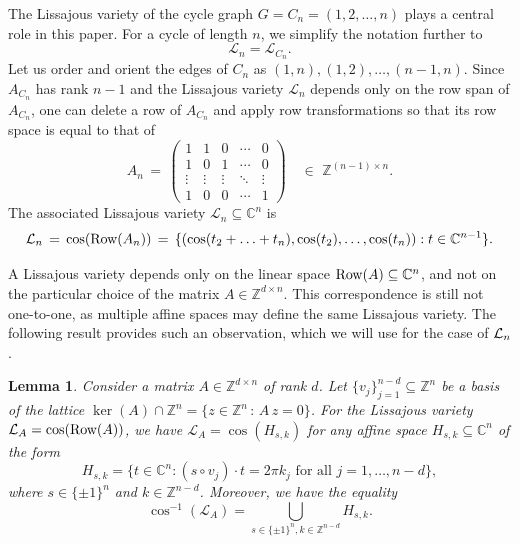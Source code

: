 \documentclass[a4paper, 11pt, twoside]{article}
\newcommand{\C}{\mathbb{C}}
\newcommand{\Row}{{\text{\rm Row}}}
\newcommand{\ML}{{\mathcal L}}
\newcommand{\Z}{\mathbb Z}
\theoremstyle{plain}
\newtheorem{lemma}[theorem]{Lemma}
\begin{document}
The Lissajous variety of the cycle graph $G=C_n=(1,2,\ldots,n)$ plays a central role in this paper. For a cycle of length $n$, we simplify the notation further to
$$\mathcal L_n=\ML_{C_n}.$$ 
Let us order and orient the edges of $C_n$ as
 $(1,n), (1,2),\ldots, (n-1,n)$. 
 Since $A_{C_n}$ has rank $n-1$ and the Lissajous variety $\mathcal L_n$ depends only on the row span of $A_{C_n}$, 
one can delete a row of $A_{C_n}$ and apply row transformations so that its row space   is equal to that of  \begin{equation} \label{eq:cycleAn} A_{n} \, = \, \begin{pmatrix}
    1 & 1 & 0 & \cdots & 0 \\ 
    1 & 0 & 1 & \cdots & 0 \\ 
    \vdots & \vdots & \vdots & \ddots & \vdots \\ 
    1 & 0 & 0 & \cdots & 1
\end{pmatrix} \quad \in \, \, \mathbb{Z}^{(n-1) \times n}.\end{equation}
 The associated Lissajous variety $\mathcal L_n \subseteq \mathbb{C}^n$ is 
 \begin{equation}
\label{eq:parametrize}
\mathcal L_n \,  = \, \cos(\Row(A_n)) \, = \, \{( \cos(t_2+\dotsc+t_n), \cos(t_2),\dotsc, \cos(t_n )): t\in \C^{n-1}\}.
\end{equation}

A Lissajous variety depends only on the linear space ${\rm Row}(A) \subseteq \mathbb{C}^n$, and not on the particular choice of the matrix $A \in \mathbb{Z}^{d \times n}$. 
This correspondence is still not one-to-one, as multiple affine  spaces may define the same Lissajous variety. 
The following result provides such an observation, which we will use for the case of ${\cal L}_n$.

\begin{lemma}\label{lem:cosH}
Consider a matrix $A\in\Z^{d\times n}$ of rank $d$. 
Let $\{v_j\}_{j=1}^{n-d}\subseteq\Z^n$ be a basis of the lattice $\ker(A)\cap \Z^n = \{z \in \mathbb{Z}^n \, : \, A \, z = 0 \}$.
For the Lissajous variety ${\cal L}_A=\cos (\Row(A))$, we have $\ML_A=\cos(H_{s,k})$ for any affine space 
$H_{s,k}\subseteq \C^n$ of the form 
\[
H_{s,k}=\{t\in \C^n: (s\circ v_j)\cdot t= 2\pi k_j \text{ for all }j=1,\dotsc,n-d\},
\]
where $s\in \{\pm 1\}^n$ and $k\in \Z^{n-d}$.
Moreover, we have the equality 
\[
\cos^{-1}(\ML_A) = \bigcup_{s\in \{\pm 1\}^n,k\in \Z^{n-d}} H_{s,k}.
\]
\end{lemma}
\end{document}
